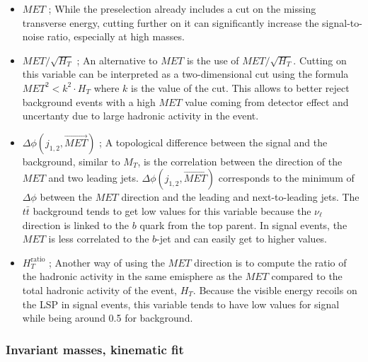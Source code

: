                 \begin{itemize}
                    \item  $MET$ ; While the preselection already includes a cut on the missing
                        transverse energy, cutting further on it can significantly increase the
                        signal-to-noise ratio, especially at high masses.
                    \item  $MET / \sqrt{H_T}$ ; An alternative to $MET$ is the use of $MET / \sqrt{H_T}$.
                        Cutting on this variable can be interpreted as a two-dimensional cut using
                        the formula $MET^{2} < k^2 \cdot H_T$ where $k$ is the value of the cut.
                        This allows to better reject background events with a high $MET$ value coming
                        from detector effect and uncertanty due to large hadronic activity in the event.
                    \item $\Delta \phi( j_{1,2}, \vec{MET} )$ ; A topological difference between the signal and the background, 
                        similar to $M_T$, is the correlation between the direction of the $MET$ and two leading jets. $\Delta 
                        \phi( j_{1,2}, \vec{MET} )$ corresponds to the minimum of $\Delta \phi$ between the $MET$ direction and 
                        the leading and next-to-leading jets. The $t\bar{t}$ background tends to get low values for this variable
                        because the $\nu_{\ell}$ direction is linked to the $b$ quark from the top parent. In signal events, 
                        the $MET$ is less correlated to the $b$-jet and can easily get to higher values.
                    \item $H_{T}^\text{ratio}$ ; Another way of using the $MET$ direction is to compute the ratio of the
                        hadronic activity in the same emisphere as the $MET$ compared to the total hadronic activity of the event,
                        $H_T$. Because the visible energy recoils on the LSP in signal events, this variable tends to have
                        low values for signal while being around 0.5 for background. 
                \end{itemize}

           \subsubsection{Invariant masses, kinematic fit}
           
